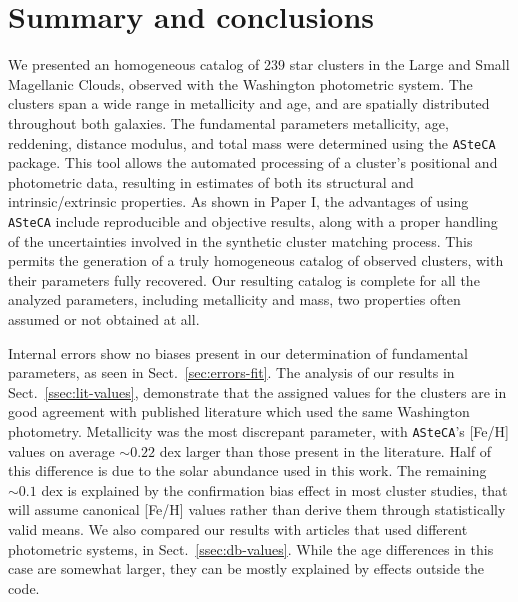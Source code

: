 \documentclass[draft]{aa}
\begin{document}

\section{Summary and conclusions}
\label{sec:summ-concl}

We presented an homogeneous catalog of 239 star clusters in the Large and Small
Magellanic Clouds, observed with the Washington photometric system. The clusters
span a wide range in metallicity and age, and are spatially distributed
throughout both galaxies.
%
The fundamental parameters metallicity, age, reddening, distance modulus, and
total mass were determined using the \texttt{ASteCA} package.
%
This tool allows the automated processing of a cluster's positional and
photometric data, resulting in estimates of both its structural and
intrinsic/extrinsic properties.
%
As shown in Paper I, the advantages of using \texttt{ASteCA} include
reproducible and objective results, along with a proper handling of the
uncertainties involved in the synthetic cluster matching process.
%
This permits the generation of a truly homogeneous catalog of observed
clusters, with their parameters fully recovered.
%
Our resulting catalog is complete for all the analyzed parameters, including
metallicity and mass, two properties often assumed or not obtained at all.

Internal errors show no biases present in our determination of fundamental
parameters, as seen in Sect.~\ref{sec:errors-fit}.
%
The analysis of our results in Sect.~\ref{ssec:lit-values}, demonstrate that the
assigned values for the clusters are in good agreement with published literature
which used the same Washington photometry.
%
Metallicity was the most discrepant parameter, with \texttt{ASteCA}'s
[Fe/H] values on average ${\sim}0.22$ dex larger than those present in the
literature. Half of this difference is due to the solar abundance used in
this work. The remaining ${\sim}0.1$ dex is explained by the confirmation
bias effect in most cluster studies, that will assume canonical [Fe/H]
values rather than derive them through statistically valid means.
%
We also compared our results with articles that used different photometric
systems, in Sect.~\ref{ssec:db-values}. While the age differences in
this case are somewhat larger, they can be mostly explained by effects outside
the code.
\end{document}
